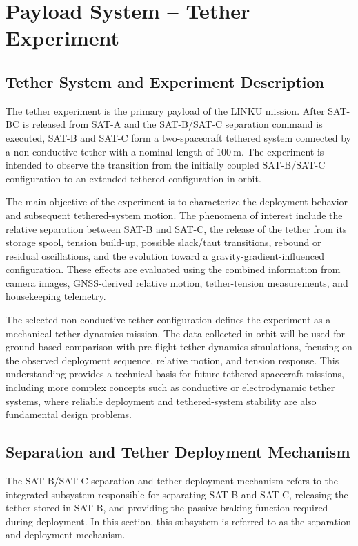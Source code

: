 \chapter{Payload System -- Tether Experiment}
\label{ch:payload_tether_experiment}

\section{Tether System and Experiment Description}
\label{sec:tether_sys_exp_desc}

The tether experiment is the primary payload of the LINKU mission. After SAT-BC is released from SAT-A and the SAT-B/SAT-C separation command is executed, SAT-B and SAT-C form a two-spacecraft tethered system connected by a non-conductive tether with a nominal length of \(100~\mathrm{m}\). The experiment is intended to observe the transition from the initially coupled SAT-B/SAT-C configuration to an extended tethered configuration in orbit.

The main objective of the experiment is to characterize the deployment behavior and subsequent tethered-system motion. The phenomena of interest include the relative separation between SAT-B and SAT-C, the release of the tether from its storage spool, tension build-up, possible slack/taut transitions, rebound or residual oscillations, and the evolution toward a gravity-gradient-influenced configuration. These effects are evaluated using the combined information from camera images, GNSS-derived relative motion, tether-tension measurements, and housekeeping telemetry.

The selected non-conductive tether configuration defines the experiment as a mechanical tether-dynamics mission. The data collected in orbit will be used for ground-based comparison with pre-flight tether-dynamics simulations, focusing on the observed deployment sequence, relative motion, and tension response. This understanding provides a technical basis for future tethered-spacecraft missions, including more complex concepts such as conductive or electrodynamic tether systems, where reliable deployment and tethered-system stability are also fundamental design problems.

\section{Separation and Tether Deployment Mechanism}
\label{sec:separation_tet_deploy_mech}

The SAT-B/SAT-C separation and tether deployment mechanism refers to the integrated subsystem responsible for separating SAT-B and SAT-C, releasing the tether stored in SAT-B, and providing the passive braking function required during deployment. In this section, this subsystem is referred to as the separation and deployment mechanism.

